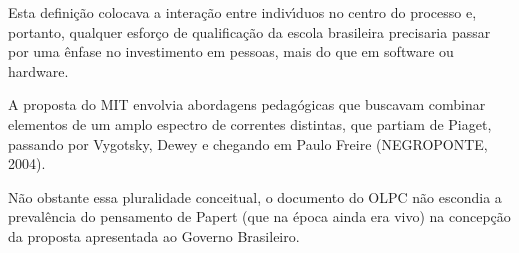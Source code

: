 \documentclass[
12pt,		%
openright,	%
twoside,  %
a4paper,			%
chapter=TITLE,		%
english,			%
french,				%
spanish,			%
brazil				%
]{USPSC-classe/USPSC}
\begin{document}
Esta defini\c{c}\~ao colocava a intera\c{c}\~ao entre indiv\'{\i}duos no centro do processo e, portanto, qualquer esfor\c{c}o de qualifica\c{c}\~ao da escola brasileira precisaria passar por uma \^enfase no investimento em \textquotedbl pessoas, mais do que em software ou hardware\textquotedbl .

















A proposta do MIT envolvia abordagens pedag\'ogicas que buscavam combinar elementos de um amplo espectro de correntes distintas, que partiam de Piaget, passando por Vygotsky, Dewey e chegando em Paulo Freire  (NEGROPONTE, 2004).

















N\~ao obstante essa pluralidade conceitual, o documento do OLPC n\~ao escondia a preval\^encia do pensamento de Papert (que na \'epoca ainda era vivo) na concep\c{c}\~ao da proposta apresentada ao Governo Brasileiro.


















\noindent\begin{center}\mbox{\centering{}}\end{center}
\end{document}
